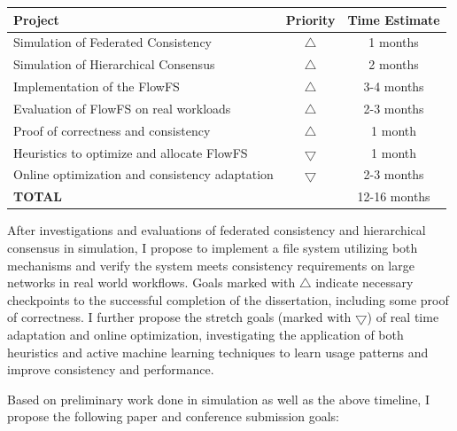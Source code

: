 \documentclass{article}
\begin{document}
\begin{center}
\begin{tabular}{|l c|c|}
\hline
Project & Priority & Time Estimate \\
\hline
Simulation of Federated Consistency & $\bigtriangleup$ & 1 months \\
Simulation of Hierarchical Consensus & $\bigtriangleup$ & 2 months \\
Implementation of the FlowFS & $\bigtriangleup$ & 3-4 months \\
Evaluation of FlowFS on real workloads & $\bigtriangleup$ & 2-3 months \\
Proof of correctness and consistency & $\bigtriangleup$ & 1 month \\
Heuristics to optimize and allocate FlowFS & $\bigtriangledown$ & 1 month \\
Online optimization and consistency adaptation & $\bigtriangledown$ & 2-3 months \\
\hline
\multicolumn{2}{|l|}{\textbf{TOTAL}} & 12-16 months \\
\hline
\end{tabular}
\end{center}

After investigations and evaluations of federated consistency and hierarchical consensus in simulation, I propose to implement a file system utilizing both mechanisms and verify the system meets consistency requirements on large networks in real world workflows. Goals marked with $\bigtriangleup$ indicate necessary checkpoints to the successful completion of the dissertation, including some proof of correctness. I further propose the stretch goals (marked with $\bigtriangledown$) of real time adaptation and online optimization, investigating the application of both heuristics and active machine learning techniques to learn usage patterns and improve consistency and performance.

Based on preliminary work done in simulation as well as the above timeline, I propose the following paper and conference submission goals:
\end{document}
